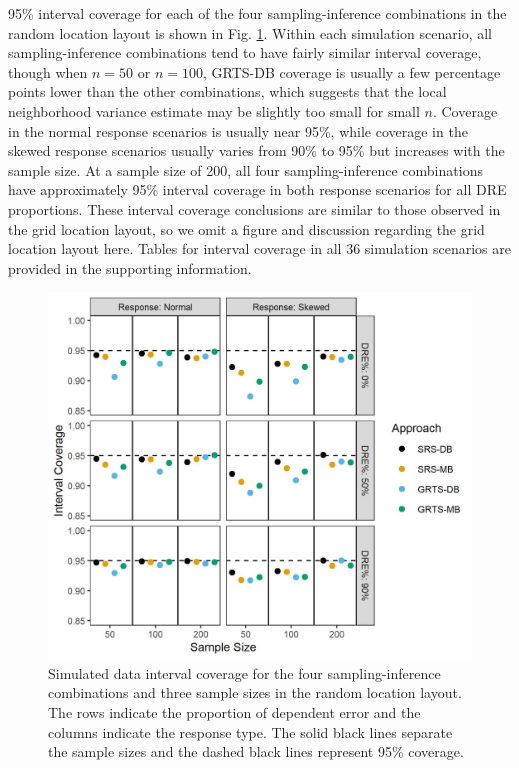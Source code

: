 \documentclass[]{elsarticle} %
\begin{document}
95\% interval coverage for each of the four sampling-inference
combinations in the random location layout is shown in Fig.
\ref{fig:figconf}. Within each simulation scenario, all
sampling-inference combinations tend to have fairly similar interval
coverage, though when \(n = 50\) or \(n = 100\), GRTS-DB coverage is
usually a few percentage points lower than the other combinations, which
suggests that the local neighborhood variance estimate may be slightly
too small for small \(n\). Coverage in the normal response scenarios is
usually near 95\%, while coverage in the skewed response scenarios
usually varies from 90\% to 95\% but increases with the sample size. At
a sample size of 200, all four sampling-inference combinations have
approximately 95\% interval coverage in both response scenarios for all
DRE proportions. These interval coverage conclusions are similar to
those observed in the grid location layout, so we omit a figure and
discussion regarding the grid location layout here. Tables for interval
coverage in all 36 simulation scenarios are provided in the supporting
information.

\begin{figure}
  \centering
  \includegraphics[width = 1\linewidth]{figures/coverage.jpeg}
  \caption{Simulated data interval coverage for the four sampling-inference combinations and three sample sizes in the random location layout. The rows indicate the proportion of dependent error and the columns indicate the response type. The solid black lines separate the sample sizes and the dashed black lines represent 95\% coverage.}
  \label{fig:figconf}
\end{figure}
\end{document}
